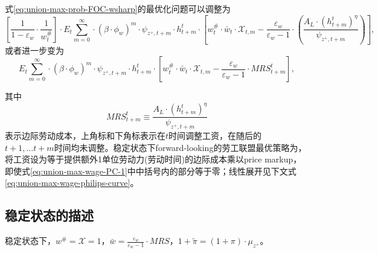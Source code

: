 
式\eqref{eq:union-max-prob-FOC-wsharp}的最优化问题可以调整为
\begin{equation}
\left[\frac{1}{1-\varepsilon_w}\cdot \frac{1}{w^{\#}_t}\right] \cdot
E_t \sum_{m=0}^{\infty} \cdot \left( \beta \cdot \phi_w\right)^{m} \cdot \psi_{z^+,t+m} \cdot h_{t+m}^{t} \cdot \left[
w_t^{\#} \cdot \bar{w}_t \cdot \mathcal{X}_{t,m} - \frac{\varepsilon_w}{\varepsilon_w -1} \cdot \left(
\frac{A_L \cdot \left( h^{t}_{t+m} \right)^{\eta}}{\psi_{z^+,t+m}}
\right)
\right],
\end{equation}
或者进一步变为
\begin{equation}
\label{eq:union-max-wage-PC-1}
E_t \sum_{m=0}^{\infty} \cdot \left( \beta \cdot \phi_w\right)^{m} \cdot \psi_{z^+,t+m} \cdot h_{t+m}^{t} \cdot \left[
w_t^{\#} \cdot \bar{w}_t \cdot \mathcal{X}_{t,m} - \frac{\varepsilon_w}{\varepsilon_w -1} \cdot MRS_{t+m}^t
\right],
\end{equation}

其中
\begin{equation}
\label{eq:union-max-wage-PC-MRS}
MRS_{t+m}^t \equiv \frac{A_L \cdot \left( h^{t}_{t+m} \right)^{\eta}}{\psi_{z^+,t+m}}
\end{equation}
表示边际劳动成本，上角标和下角标表示在$t$时间调整工资，在随后的$t+1,\ldots t+m$时间均未调整。稳定状态下forward-looking的劳工联盟最优策略为，将工资设为等于提供额外1单位劳动力(劳动时间)的边际成本乘以price markup，即使式\eqref{eq:union-max-wage-PC-1}中中括号内的部分等于零；线性展开见下文式\eqref{eq:union-max-wage-philips-curve}。

\subsection{稳定状态的描述}
\label{sec:union-wage-PC-ss-description}
稳定状态下，$w^{\#}=\mathcal{X}=1$，$\bar{w}=\frac{\varepsilon_w}{\varepsilon_w -1} \cdot MRS$，$1+\tilde{\pi} = (1+\pi) \cdot \mu_{z^+}$。

